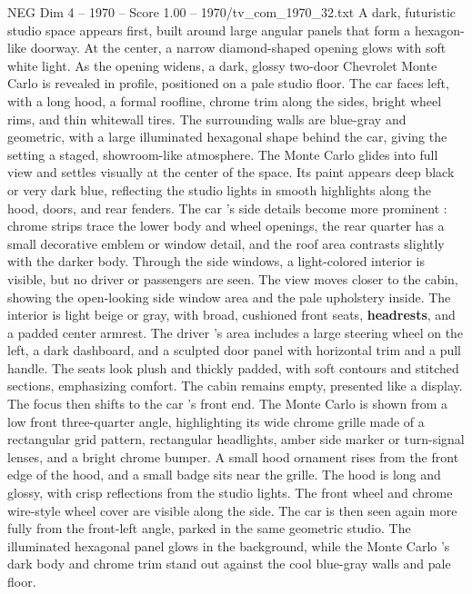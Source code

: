 \begin{textsample}{NEG Dim 4 – 1970 – Score 1.00 – 1970/tv\_com\_1970\_32.txt}  \label{ex:f4_neg_010}
A dark, futuristic studio space appears first, built around large angular panels that form a hexagon-like doorway.
At the center, a narrow diamond-shaped opening glows with soft white light.
As the opening widens, a dark, glossy two-door Chevrolet Monte Carlo is revealed in profile, positioned on a pale studio floor.
The car faces left, with a long hood, a formal roofline, chrome trim along the sides, bright wheel rims, and thin whitewall tires.
The surrounding walls are blue-gray and geometric, with a large illuminated hexagonal shape behind the car, giving the setting a staged, showroom-like atmosphere.
The Monte Carlo glides into full view and settles visually at the center of the space.
Its paint appears deep black or very dark blue, reflecting the studio lights in smooth highlights along the hood, doors, and rear fenders.
The car ’s side details become more prominent : chrome strips trace the lower body and wheel openings, the rear quarter has a small decorative emblem or window detail, and the roof area contrasts slightly with the darker body.
Through the side windows, a light-colored interior is visible, but no driver or passengers are seen.
The view moves closer to the cabin, showing the open-looking side window area and the pale upholstery inside.
The interior is light beige or gray, with broad, cushioned front seats, \textbf{headrests}, and a padded center armrest.
The driver ’s area includes a large steering wheel on the left, a dark dashboard, and a sculpted door panel with horizontal trim and a pull handle.
The seats look plush and thickly padded, with soft contours and stitched sections, emphasizing comfort.
The cabin remains empty, presented like a display.
The focus then shifts to the car ’s front end.
The Monte Carlo is shown from a low front three-quarter angle, highlighting its wide chrome grille made of a rectangular grid pattern, rectangular headlights, amber side marker or turn-signal lenses, and a bright chrome bumper.
A small hood ornament rises from the front edge of the hood, and a small badge sits near the grille.
The hood is long and glossy, with crisp reflections from the studio lights.
The front wheel and chrome wire-style wheel cover are visible along the side.
The car is then seen again more fully from the front-left angle, parked in the same geometric studio.
The illuminated hexagonal panel glows in the background, while the Monte Carlo ’s dark body and chrome trim stand out against the cool blue-gray walls and pale floor.

\end{textsample}
